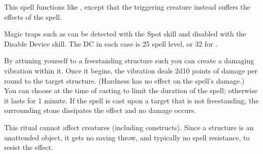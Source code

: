 \begin{spelleffect}
This spell functions like , except that the triggering creature instead suffers the effects of the  spell.
\end{spelleffect}
\begin{spellnotes}
Magic traps such as  can be detected with the Spot skill and disabled with the Disable Device skill. The DC in each case is 25 \add spell level, or 32 for .
\end{spellnotes}

\begin{spelleffect}
By attuning yourself to a freestanding structure such you can create a damaging vibration within it. Once it begins, the vibration deals 2d10 points of damage per round to the target structure. (Hardness has no effect on the spell's damage.) You can choose at the time of casting to limit the duration of the spell; otherwise it lasts for 1 minute. If the spell is cast upon a target that is not freestanding, the surrounding stone dissipates the effect and no damage occurs.
\end{spelleffect}
\begin{spellnotes}
This ritual cannot affect creatures (including constructs). Since a structure is an unattended object, it gets no saving throw, and typically no spell resistance, to resist the effect.
\end{spellnotes}

